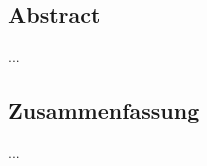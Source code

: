 \begingroup
\let\clearpage\relax
\let\cleardoublepage\relax
\let\cleardoublepage\relax

\begin{otherlanguage}{american}
	\chapter*{Abstract}
    ...
\end{otherlanguage}

\newpage
\cleardoublepage

\begin{otherlanguage}{ngerman}
	\chapter*{Zusammenfassung}
    ...
\end{otherlanguage}

\endgroup

\vfill
